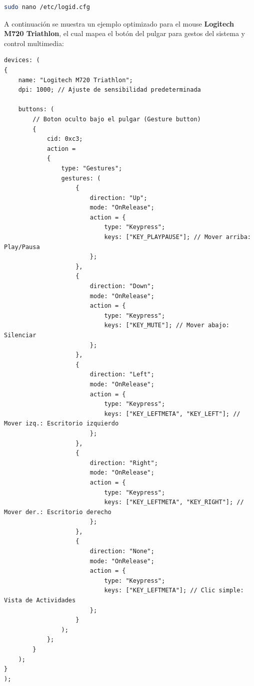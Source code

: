 \documentclass[11pt,a4paper]{article}
\begin{document}
\begin{lstlisting}[language=bash]
sudo nano /etc/logid.cfg
\end{lstlisting}

A continuación se muestra un ejemplo optimizado para el mouse \textbf{Logitech M720 Triathlon}, el cual mapea el botón del pulgar para gestos del sistema y control multimedia:

\begin{lstlisting}
devices: (
{
    name: "Logitech M720 Triathlon";
    dpi: 1000; // Ajuste de sensibilidad predeterminada

    buttons: (
        // Boton oculto bajo el pulgar (Gesture button)
        {
            cid: 0xc3;
            action =
            {
                type: "Gestures";
                gestures: (
                    {
                        direction: "Up";
                        mode: "OnRelease";
                        action = {
                            type: "Keypress";
                            keys: ["KEY_PLAYPAUSE"]; // Mover arriba: Play/Pausa
                        };
                    },
                    {
                        direction: "Down";
                        mode: "OnRelease";
                        action = {
                            type: "Keypress";
                            keys: ["KEY_MUTE"]; // Mover abajo: Silenciar
                        };
                    },
                    {
                        direction: "Left";
                        mode: "OnRelease";
                        action = {
                            type: "Keypress";
                            keys: ["KEY_LEFTMETA", "KEY_LEFT"]; // Mover izq.: Escritorio izquierdo
                        };
                    },
                    {
                        direction: "Right";
                        mode: "OnRelease";
                        action = {
                            type: "Keypress";
                            keys: ["KEY_LEFTMETA", "KEY_RIGHT"]; // Mover der.: Escritorio derecho
                        };
                    },
                    {
                        direction: "None";
                        mode: "OnRelease";
                        action = {
                            type: "Keypress";
                            keys: ["KEY_LEFTMETA"]; // Clic simple: Vista de Actividades
                        };
                    }
                );
            };
        }
    );
}
);
\end{lstlisting}
\end{document}
